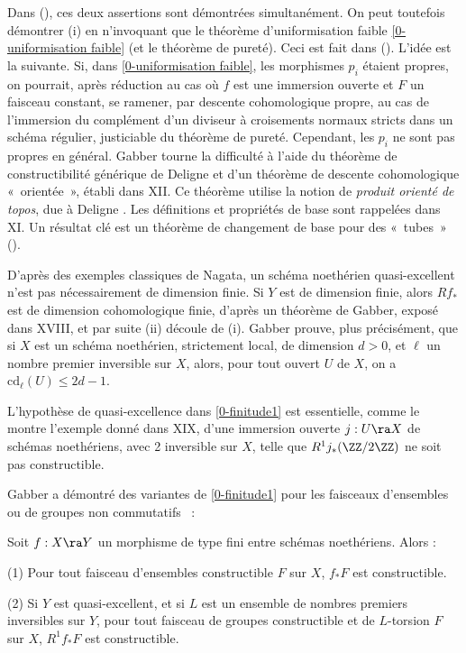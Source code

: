 \documentclass[10pt]{../fichiers-configuration-latex/smfart}
\begin{document}
Dans (), ces deux assertions sont démontrées
simultanément. On peut toutefois démontrer (i) en n'invoquant que le théorème d'uniformisation
faible \ref{0-uniformisation faible} (et le théorème de pureté). Ceci est fait dans
(). L'idée est la suivante. Si, dans
\ref{0-uniformisation faible}, les morphismes $p_i$ étaient propres, on pourrait, après réduction au
cas où $f$ est une immersion ouverte et $F$ un faisceau constant, se ramener, par descente
cohomologique propre, au cas de l'immersion du complément d'un diviseur à croisements normaux
stricts dans un schéma régulier, justiciable du théorème de pureté. Cependant, les $p_i$ ne sont pas
propres en général. Gabber tourne la difficulté à l'aide du théorème de constructibilité générique
de Deligne  et d'un théorème de descente cohomologique
« orientée », établi dans XII. Ce théorème utilise la notion de \textit{produit orienté de topos},
due à Deligne \cite{AG_Tokyo-Kyoto@Laumon}. Les définitions et propriétés de base sont rappelées
dans XI. Un résultat clé est un théorème de changement de
base pour des « tubes » ().

D'après des exemples classiques de Nagata, un schéma noethérien quasi-excellent n'est pas
nécessairement de dimension finie. Si $Y$ est de dimension finie, alors $Rf_*$ est de dimension
cohomologique finie, d'après un théorème de Gabber, exposé dans XVIII, et par suite (ii) découle de
(i). Gabber prouve, plus précisément, que si $X$ est un schéma noethérien, strictement local, de
dimension $d >0$, et $\ell$ un nombre premier inversible sur $X$, alors, pour tout ouvert $U$ de
$X$, on a $\mathrm{cd}_{\ell}(U) \le 2d-1$.

L'hypothèse de quasi-excellence dans \ref{0-finitude1} est essentielle, comme le montre l'exemple
donné dans XIX, d'une immersion ouverte $j : U \ra X$ de schémas noethériens, avec 2 inversible sur
$X$, telle que $R^1j_*(\ZZ/2\ZZ)$ ne soit pas constructible. 

Gabber a démontré des variantes de \ref{0-finitude1} pour les faisceaux d'ensembles ou de groupes
non commutatifs \cite{Conference-Illusie@Gabber}~:

\begin{theoreme}\label{0-finitude2}
Soit $f : X \ra Y$ un morphisme de type fini entre schémas noethériens. Alors :

(1) Pour tout faisceau d'ensembles constructible $F$ sur $X$, $f_*F$ est constructible.

(2) Si $Y$ est quasi-excellent, et si $L$ est un ensemble de nombres premiers inversibles sur $Y$,
pour tout faisceau de groupes constructible et de $L$-torsion $F$ sur $X$, $R^1f_*F$ est
constructible.
\end{theoreme}
\end{document}
